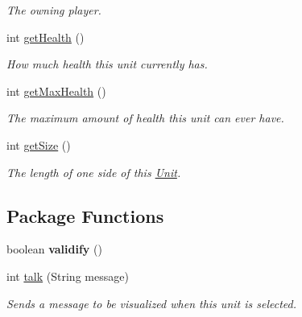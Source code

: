 \begin{DoxyCompactItemize}
\begin{DoxyCompactList}\small\item\em The owning player. \item\end{DoxyCompactList}\item 
\hypertarget{classWall_acbd7416f4b3c91f7fa61ac333569a7d3}{
int \hyperlink{classWall_acbd7416f4b3c91f7fa61ac333569a7d3}{getHealth} ()}
\label{classWall_acbd7416f4b3c91f7fa61ac333569a7d3}

\begin{DoxyCompactList}\small\item\em How much health this unit currently has. \item\end{DoxyCompactList}\item 
\hypertarget{classWall_a12272e3cece96525f95e8cfb8d487018}{
int \hyperlink{classWall_a12272e3cece96525f95e8cfb8d487018}{getMaxHealth} ()}
\label{classWall_a12272e3cece96525f95e8cfb8d487018}

\begin{DoxyCompactList}\small\item\em The maximum amount of health this unit can ever have. \item\end{DoxyCompactList}\item 
\hypertarget{classWall_aee963ee4c54a303ae5d4ca39033decc2}{
int \hyperlink{classWall_aee963ee4c54a303ae5d4ca39033decc2}{getSize} ()}
\label{classWall_aee963ee4c54a303ae5d4ca39033decc2}

\begin{DoxyCompactList}\small\item\em The length of one side of this \hyperlink{classUnit}{Unit}. \item\end{DoxyCompactList}\end{DoxyCompactItemize}
\subsection*{Package Functions}
\begin{DoxyCompactItemize}
\item 
\hypertarget{classWall_a147f22fc78edfc3ea58514c5a5454e5e}{
boolean {\bfseries validify} ()}
\label{classWall_a147f22fc78edfc3ea58514c5a5454e5e}

\item 
\hypertarget{classWall_a517885482e72263ea0aa70f246353b28}{
int \hyperlink{classWall_a517885482e72263ea0aa70f246353b28}{talk} (String message)}
\label{classWall_a517885482e72263ea0aa70f246353b28}

\begin{DoxyCompactList}\small\item\em Sends a message to be visualized when this unit is selected. \item\end{DoxyCompactList}\end{DoxyCompactItemize}
